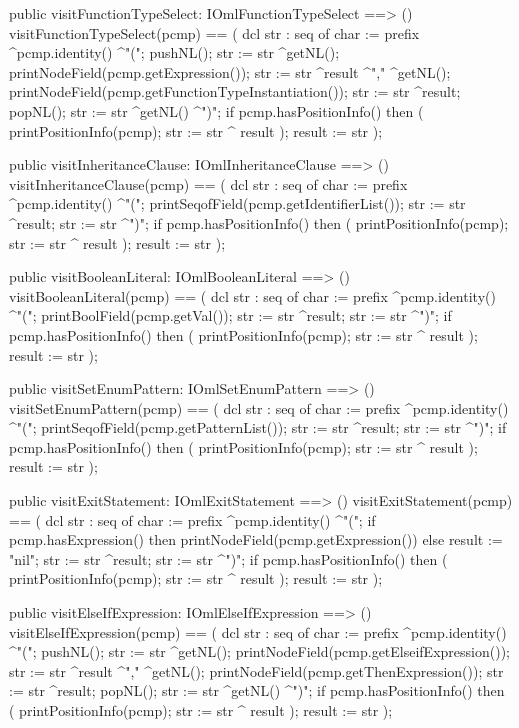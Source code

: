 \begin{vdm_al}
  public visitFunctionTypeSelect: IOmlFunctionTypeSelect ==> ()
  visitFunctionTypeSelect(pcmp) ==
    ( dcl str : seq of char := prefix ^pcmp.identity() ^"(";
      pushNL();
      str := str ^getNL();
      printNodeField(pcmp.getExpression());
      str := str ^result ^"," ^getNL();
      printNodeField(pcmp.getFunctionTypeInstantiation());
      str := str ^result;
      popNL();
      str := str ^getNL() ^")";
      if pcmp.hasPositionInfo()
      then ( printPositionInfo(pcmp);
             str := str ^ result );
      result := str );

  public visitInheritanceClause: IOmlInheritanceClause ==> ()
  visitInheritanceClause(pcmp) ==
    ( dcl str : seq of char := prefix ^pcmp.identity() ^"(";
      printSeqofField(pcmp.getIdentifierList());
      str := str ^result;
      str := str ^")";
      if pcmp.hasPositionInfo()
      then ( printPositionInfo(pcmp);
             str := str ^ result );
      result := str );

  public visitBooleanLiteral: IOmlBooleanLiteral ==> ()
  visitBooleanLiteral(pcmp) ==
    ( dcl str : seq of char := prefix ^pcmp.identity() ^"(";
      printBoolField(pcmp.getVal());
      str := str ^result;
      str := str ^")";
      if pcmp.hasPositionInfo()
      then ( printPositionInfo(pcmp);
             str := str ^ result );
      result := str );

  public visitSetEnumPattern: IOmlSetEnumPattern ==> ()
  visitSetEnumPattern(pcmp) ==
    ( dcl str : seq of char := prefix ^pcmp.identity() ^"(";
      printSeqofField(pcmp.getPatternList());
      str := str ^result;
      str := str ^")";
      if pcmp.hasPositionInfo()
      then ( printPositionInfo(pcmp);
             str := str ^ result );
      result := str );

  public visitExitStatement: IOmlExitStatement ==> ()
  visitExitStatement(pcmp) ==
    ( dcl str : seq of char := prefix ^pcmp.identity() ^"(";
      if pcmp.hasExpression()
      then printNodeField(pcmp.getExpression())
      else result := "nil";
      str := str ^result;
      str := str ^")";
      if pcmp.hasPositionInfo()
      then ( printPositionInfo(pcmp);
             str := str ^ result );
      result := str );

  public visitElseIfExpression: IOmlElseIfExpression ==> ()
  visitElseIfExpression(pcmp) ==
    ( dcl str : seq of char := prefix ^pcmp.identity() ^"(";
      pushNL();
      str := str ^getNL();
      printNodeField(pcmp.getElseifExpression());
      str := str ^result ^"," ^getNL();
      printNodeField(pcmp.getThenExpression());
      str := str ^result;
      popNL();
      str := str ^getNL() ^")";
      if pcmp.hasPositionInfo()
      then ( printPositionInfo(pcmp);
             str := str ^ result );
      result := str );


\end{vdm_al}
